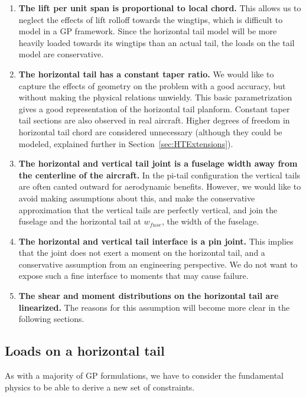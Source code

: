 \begin{enumerate}
    \item \textbf{The lift per unit span is proportional to local chord.} This allows 
    us to neglect the effects of lift rolloff towards the wingtips, which is difficult
    to model in a \gls{GP} framework.  Since the horizontal tail model will 
    be more heavily loaded towards its wingtips than an actual tail, the loads
    on the tail model are conservative. 
    \item \textbf{The horizontal tail has a constant taper ratio.} We would like to 
    capture the effects of geometry on the problem with a good 
    accuracy, but without making the physical relations unwieldy. This basic parametrization
    gives a good representation of the horizontal tail planform.  
    Constant taper tail sections are also observed in real aircraft. 
    Higher degrees of freedom in horizontal tail chord are considered unnecessary 
    (although they could be modeled, explained further in Section~\ref{sec:HTExtensions}). 
    \item \textbf{The horizontal and vertical tail joint is a fuselage width away from 
    the centerline of the aircraft.} In the pi-tail configuration the vertical tails are 
    often canted outward for aerodynamic benefits. However, we would like to avoid making 
    assumptions about this, and make the conservative approximation that the vertical tails
    are perfectly vertical, and join the fuselage and the horizontal tail at $w_{fuse}$, the
    width of the fuselage.
    \item \textbf{The horizontal and vertical tail interface is a pin joint.} This implies 
    that the joint does not exert a moment on the horizontal tail, and a conservative 
    assumption from an engineering perspective. We do not want to expose such a fine 
    interface to moments that may cause failure. \label{item:pinjoint}
    \item \textbf{The shear and moment distributions on the horizontal tail are 
    linearized.} The reasons for this assumption will become more clear in 
    the following sections. 
\end{enumerate}

\subsection{Loads on a horizontal tail}
\label{sec:HTloads}

As with a majority of \gls{GP} formulations, we have to consider the fundamental physics to 
be able to derive a new set of constraints. 

